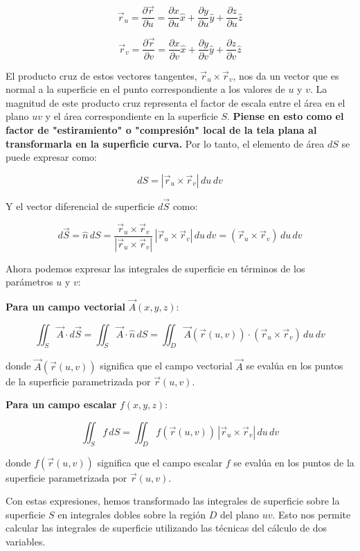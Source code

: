 \documentclass{article}
\begin{document}
\[
\vec{r}_u = \frac{\partial \vec{r}}{\partial u} = \frac{\partial x}{\partial u}\hat{x} + \frac{\partial y}{\partial u}\hat{y} + \frac{\partial z}{\partial u}\hat{z}
\]

\[
\vec{r}_v = \frac{\partial \vec{r}}{\partial v} = \frac{\partial x}{\partial v}\hat{x} + \frac{\partial y}{\partial v}\hat{y} + \frac{\partial z}{\partial v}\hat{z}
\]

El producto cruz de estos vectores tangentes, $\vec{r}_u \times \vec{r}_v$, nos da un vector que es normal a la superficie en el punto correspondiente a los valores de $u$ y $v$. La magnitud de este producto cruz representa el factor de escala entre el área en el plano $uv$ y el área correspondiente en la superficie $S$.  \textbf{Piense en esto como el factor de "estiramiento" o "compresión" local de la tela plana al transformarla en la superficie curva.} Por lo tanto, el elemento de área $dS$ se puede expresar como:

\[
dS = |\vec{r}_u \times \vec{r}_v| \, du \, dv
\]

Y el vector diferencial de superficie $d\vec{S}$ como:

\[
d\vec{S} = \hat{n} \, dS = \frac{\vec{r}_u \times \vec{r}_v}{|\vec{r}_u \times \vec{r}_v|} \, |\vec{r}_u \times \vec{r}_v| \, du \, dv = (\vec{r}_u \times \vec{r}_v) \, du \, dv
\]

Ahora podemos expresar las integrales de superficie en términos de los parámetros $u$ y $v$:

\textbf{Para un campo vectorial} $\vec{A}(x,y,z)$:

\[
\iint_S \vec{A} \cdot d\vec{S} = \iint_S \vec{A} \cdot \hat{n} \, dS = \iint_D \vec{A}(\vec{r}(u,v)) \cdot (\vec{r}_u \times \vec{r}_v) \, du \, dv
\]

donde $\vec{A}(\vec{r}(u,v))$ significa que el campo vectorial $\vec{A}$ se evalúa en los puntos de la superficie parametrizada por $\vec{r}(u,v)$.

\textbf{Para un campo escalar} $f(x,y,z)$:

\[
\iint_S f \, dS = \iint_D f(\vec{r}(u,v)) \, |\vec{r}_u \times \vec{r}_v| \, du \, dv
\]

donde $f(\vec{r}(u,v))$ significa que el campo escalar $f$ se evalúa en los puntos de la superficie parametrizada por $\vec{r}(u,v)$.

Con estas expresiones, hemos transformado las integrales de superficie sobre la superficie $S$ en integrales dobles sobre la región $D$ del plano $uv$. Esto nos permite calcular las integrales de superficie utilizando las técnicas del cálculo de dos variables.\\
\end{document}
